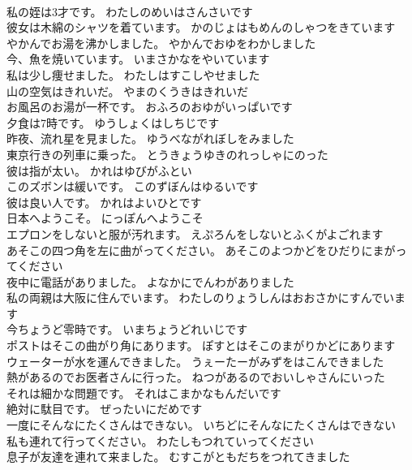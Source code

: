 \documentclass[8pt]{extreport}
\begin{document}
\begin{CJK}{UTF8}{min}
\\	私の姪は3才です。	わたしのめいはさんさいです 
\\	彼女は木綿のシャツを着ています。	かのじょはもめんのしゃつをきています 
\\	やかんでお湯を沸かしました。	やかんでおゆをわかしました 
\\	今、魚を焼いています。	いまさかなをやいています 
\\	私は少し痩せました。	わたしはすこしやせました 
\\	山の空気はきれいだ。	やまのくうきはきれいだ 
\\	お風呂のお湯が一杯です。	おふろのおゆがいっぱいです 
\\	夕食は7時です。	ゆうしょくはしちじです 
\\	昨夜、流れ星を見ました。	ゆうべながれぼしをみました 
\\	東京行きの列車に乗った。	とうきょうゆきのれっしゃにのった 
\\	彼は指が太い。	かれはゆびがふとい 
\\	このズボンは緩いです。	このずぼんはゆるいです 
\\	彼は良い人です。	かれはよいひとです 
\\	日本へようこそ。	にっぽんへようこそ 
\\	エプロンをしないと服が汚れます。	えぷろんをしないとふくがよごれます 
\\	あそこの四つ角を左に曲がってください。	あそこのよつかどをひだりにまがってください 
\\	夜中に電話がありました。	よなかにでんわがありました 
\\	私の両親は大阪に住んでいます。	わたしのりょうしんはおおさかにすんでいます 
\\	今ちょうど零時です。	いまちょうどれいじです 
\\	ポストはそこの曲がり角にあります。	ぽすとはそこのまがりかどにあります 
\\	ウェーターが水を運んできました。	うぇーたーがみずをはこんできました 
\\	熱があるのでお医者さんに行った。	ねつがあるのでおいしゃさんにいった 
\\	それは細かな問題です。	それはこまかなもんだいです 
\\	絶対に駄目です。	ぜったいにだめです 
\\	一度にそんなにたくさんはできない。	いちどにそんなにたくさんはできない 
\\	私も連れて行ってください。	わたしもつれていってください 
\\	息子が友達を連れて来ました。	むすこがともだちをつれてきました 

\end{CJK}
\end{document}
